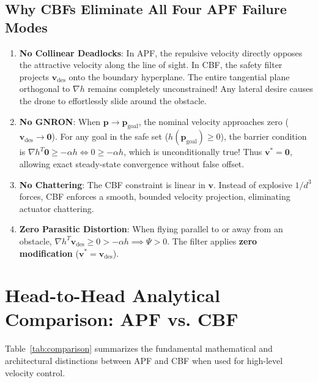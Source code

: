 \documentclass[11pt,a4paper]{article}
\begin{document}
\subsection{Why CBFs Eliminate All Four APF Failure Modes}
\begin{enumerate}
    \item \textbf{No Collinear Deadlocks}: In APF, the repulsive velocity directly opposes the attractive velocity along the line of sight. In CBF, the safety filter projects $\mathbf{v}_{\mathrm{des}}$ onto the boundary hyperplane. The entire tangential plane orthogonal to $\nabla h$ remains completely unconstrained! Any lateral desire causes the drone to effortlessly slide around the obstacle.
    \item \textbf{No GNRON}: When $\mathbf{p} \to \mathbf{p}_{\mathrm{goal}}$, the nominal velocity approaches zero ($\mathbf{v}_{\mathrm{des}} \to \mathbf{0}$). For any goal in the safe set ($h(\mathbf{p}_{\mathrm{goal}}) \ge 0$), the barrier condition is $\nabla h^T \mathbf{0} \ge -\alpha h \iff 0 \ge -\alpha h$, which is unconditionally true! Thus $\mathbf{v}^* = \mathbf{0}$, allowing exact steady-state convergence without false offset.
    \item \textbf{No Chattering}: The CBF constraint is linear in $\mathbf{v}$. Instead of explosive $1/d^3$ forces, CBF enforces a smooth, bounded velocity projection, eliminating actuator chattering.
    \item \textbf{Zero Parasitic Distortion}: When flying parallel to or away from an obstacle, $\nabla h^T \mathbf{v}_{\mathrm{des}} \ge 0 > -\alpha h \implies \Psi > 0$. The filter applies \textbf{zero modification} ($\mathbf{v}^* = \mathbf{v}_{\mathrm{des}}$).
\end{enumerate}

\section{Head-to-Head Analytical Comparison: APF vs. CBF}

Table~\ref{tab:comparison} summarizes the fundamental mathematical and architectural distinctions between APF and CBF when used for high-level velocity control.
\end{document}
